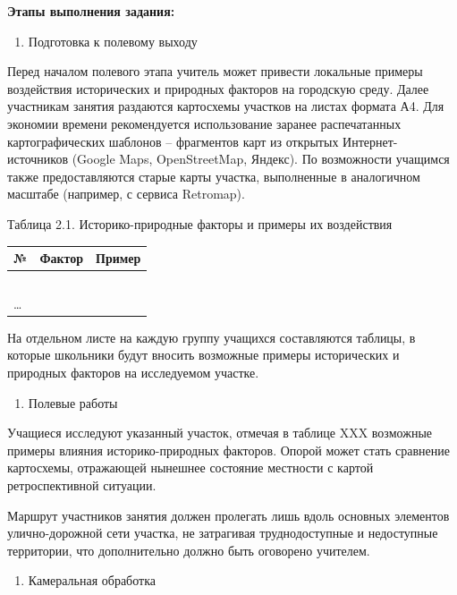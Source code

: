\documentclass[
  11pt,
]{book}
\providecommand{\tightlist}{%
  \setlength{\itemsep}{0pt}\setlength{\parskip}{0pt}}
\begin{document}
\textbf{Этапы выполнения задания:}

\begin{enumerate}
\def\labelenumi{\arabic{enumi}.}
\tightlist
\item
  Подготовка к полевому выходу
\end{enumerate}

Перед началом полевого этапа учитель может привести локальные примеры воздействия исторических и природных факторов на городскую среду. Далее участникам занятия раздаются картосхемы участков на листах формата А4. Для экономии времени рекомендуется использование заранее распечатанных картографических шаблонов -- фрагментов карт из открытых Интернет-источников (Google Maps, OpenStreetMap, Яндекс). По возможности учащимся также предоставляются старые карты участка, выполненные в аналогичном масштабе (например, с сервиса Retromap).

Таблица 2.1. Историко-природные факторы и примеры их воздействия

\begin{longtable}[]{@{}lll@{}}
\toprule\noalign{}
№ & Фактор & Пример \\
\midrule\noalign{}
\endhead
\bottomrule\noalign{}
\endlastfoot
1 & ~ & ~ \\
\ldots{} & ~ & ~ \\
\end{longtable}

На отдельном листе на каждую группу учащихся составляются таблицы, в которые школьники будут вносить возможные примеры исторических и природных факторов на исследуемом участке.

\begin{enumerate}
\def\labelenumi{\arabic{enumi}.}
\setcounter{enumi}{1}
\tightlist
\item
  Полевые работы
\end{enumerate}

Учащиеся исследуют указанный участок, отмечая в таблице XXX возможные примеры влияния историко-природных факторов. Опорой может стать сравнение картосхемы, отражающей нынешнее состояние местности с картой ретроспективной ситуации.

Маршрут участников занятия должен пролегать лишь вдоль основных элементов улично-дорожной сети участка, не затрагивая труднодоступные и недоступные территории, что дополнительно должно быть оговорено учителем.

\begin{enumerate}
\def\labelenumi{\arabic{enumi}.}
\setcounter{enumi}{2}
\tightlist
\item
  Камеральная обработка
\end{enumerate}
\end{document}
